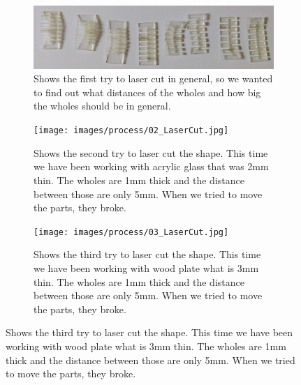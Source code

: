 \documentclass[doc.tex]{subfiles}
\begin{document}
        \begin{figure}[H]
            \centering
            \begin{subfigure}{.45\textwidth}
              \centering
              \includegraphics[width=0.8\linewidth]{images/process/01_LaserCut.jpg}
              \caption{Shows the first try to laser cut in general, so we wanted to
                       find out what distances of the wholes and how big the wholes 
                       should be in general.}
              \label{fig:01_LaserCut}
              \vspace{6mm}
            \end{subfigure}
            \hspace{1mm}
            \begin{subfigure}{.45\textwidth}
                \centering
                \texttt{[image: images/process/02\_LaserCut.jpg]}
                \caption{Shows the second try to laser cut the shape. This time we have been
                         working with acrylic glass that was 2mm thin. The wholes are 1mm thick 
                         and the distance between those are only 5mm. When we tried to move
                         the parts, they broke.}
                \label{fig:02_LaserCut}
                \vspace{6mm}
            \end{subfigure}
            \hspace{1mm}
            \begin{subfigure}{.45\textwidth}
                \centering
                \texttt{[image: images/process/03\_LaserCut.jpg]}
                \caption{Shows the third try to laser cut the shape. This time we have been
                         working with wood plate what is 3mm thin. The wholes are 1mm thick 
                         and the distance between those are only 5mm. When we tried to move
                         the parts, they broke.}
                \label{fig:03_LaserCut}
                \vspace{6mm}
            \end{subfigure}
            \hspace{1mm}

\end{figure}
\end{document}
